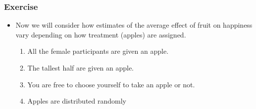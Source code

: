 \documentclass[xcolor=x11names,compress]{beamer}\usepackage[]{graphicx}\usepackage[]{color}
\renewcommand{\(}{\begin{columns}}
\renewcommand{\)}{\end{columns}}
\newcommand{\<}[1]{\begin{column}{#1}}
\renewcommand{\>}{\end{column}}
\begin{document}
\begin{frame}
\frametitle{Exercise}
\begin{itemize}
\item Now we will consider how estimates of the average effect of fruit on happiness vary depending on how treatment (apples) are assigned.
\pause
\begin{enumerate}
\item All the female participants are given an apple.
\pause
\item The tallest half are given an apple.
\pause
\item You are free to choose yourself to take an apple or not.
\pause
\item Apples are distributed randomly
\end{enumerate}
\end{itemize}
\end{frame}
\end{document}
